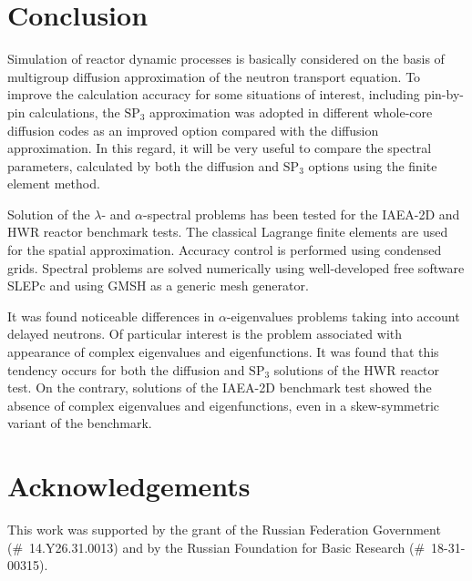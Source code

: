 \documentclass[authoryear]{elsarticle}
\begin{document}
\pagebreak
\section*{Conclusion}

Simulation of reactor dynamic processes is basically considered on the basis of multigroup diffusion approximation of the neutron transport equation. 
To improve the calculation accuracy for some situations of interest, including pin-by-pin calculations, the $\mathrm{SP_3}$ approximation was adopted in different whole-core diffusion codes as an improved option compared with the diffusion approximation. 
In this regard, it will be very useful to compare the spectral parameters, calculated by both the diffusion and $\mathrm{SP_3}$ options using the finite element method. 

Solution of the $\lambda$- and $\alpha$-spectral problems has been tested for the IAEA-2D and HWR reactor benchmark tests. 
The classical Lagrange finite elements are used for the spatial approximation. 
Accuracy control is performed using condensed grids. 
Spectral problems are solved numerically using well-developed free software SLEPc and using GMSH as a generic mesh generator.

It was found noticeable differences in $\alpha$-eigenvalues problems taking into account delayed neutrons. 
Of particular interest is the problem associated with appearance of complex eigenvalues and eigenfunctions. 
It was found that this tendency occurs for both the diffusion and $\mathrm{SP_3}$ solutions of the HWR reactor test. 
On the contrary, solutions of the IAEA-2D benchmark test showed the absence of complex eigenvalues and eigenfunctions, even in a skew-symmetric variant of the benchmark.

\section*{Acknowledgements}

This work was supported by the grant of the Russian Federation Government (\#~14.Y26.31.0013) and by the Russian Foundation for Basic Research (\#~18-31-00315).

\section*{}

\end{document}
